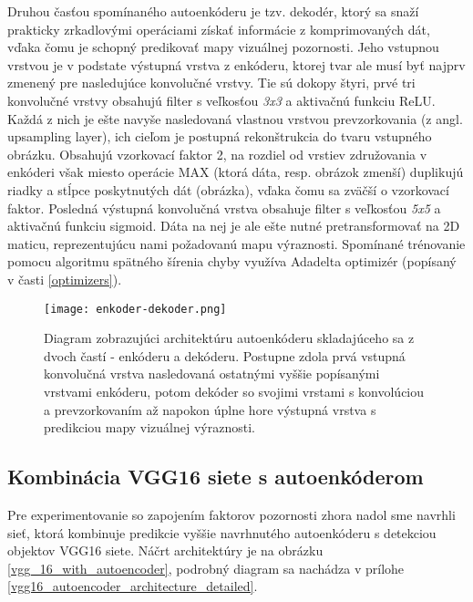 Druhou časťou spomínaného autoenkóderu je tzv. dekodér, ktorý sa snaží prakticky zrkadlovými operáciami získať informácie z komprimovaných dát, vďaka čomu je schopný predikovať mapy vizuálnej pozornosti. Jeho vstupnou vrstvou je v podstate výstupná vrstva z enkóderu, ktorej tvar ale musí byť najprv zmenený pre nasledujúce konvolučné vrstvy. Tie sú dokopy štyri, prvé tri konvolučné vrstvy obsahujú filter s veľkosťou \textit{3x3} a aktivačnú funkciu ReLU. Každá z nich je ešte navyše nasledovaná vlastnou vrstvou
prevzorkovania (z angl. upsampling layer), ich cieľom je postupná rekonštrukcia do tvaru vstupného obrázku. Obsahujú vzorkovací faktor 2, na rozdiel od vrstiev združovania v enkóderi však miesto operácie MAX (ktorá dáta, resp. obrázok zmenší) duplikujú riadky a stĺpce poskytnutých dát (obrázka), vďaka čomu sa zväčší o vzorkovací faktor. Posledná výstupná konvolučná vrstva obsahuje filter s veľkosťou \textit{5x5} a aktivačnú funkciu sigmoid. Dáta na nej je ale ešte nutné pretransformovať na 2D maticu, reprezentujúcu nami požadovanú mapu výraznosti. Spomínané trénovanie pomocu algoritmu spätného šírenia chyby využíva Adadelta optimizér (popísaný v časti \ref{optimizers}).

\begin{figure}[H]
	\begin{center}
		\texttt{[image: enkoder-dekoder.png]}
		\caption[Diagram navrhnutého autoenkóderu]{
			Diagram zobrazujúci architektúru autoenkóderu skladajúceho sa z dvoch častí - enkóderu a dekóderu. Postupne zdola prvá vstupná konvolučná vrstva nasledovaná ostatnými vyššie popísanými vrstvami enkóderu, potom dekóder so svojimi vrstami s konvolúciou a prevzorkovaním až napokon úplne hore výstupná vrstva s predikciou mapy vizuálnej výraznosti. 
		}\label{autoencoder_structure}
	\end{center}
\end{figure}

\subsection{Kombinácia VGG16 siete s autoenkóderom}
\label{vgg16_combination_with_autoencoder}
Pre experimentovanie so zapojením faktorov pozornosti zhora nadol sme navrhli sieť, ktorá kombinuje predikcie vyššie navrhnutého autoenkóderu s detekciou objektov VGG16 siete. Náčrt architektúry je na obrázku \ref{vgg_16_with_autoencoder}, podrobný diagram sa nachádza v prílohe \ref{vgg16_autoencoder_architecture_detailed}. 

